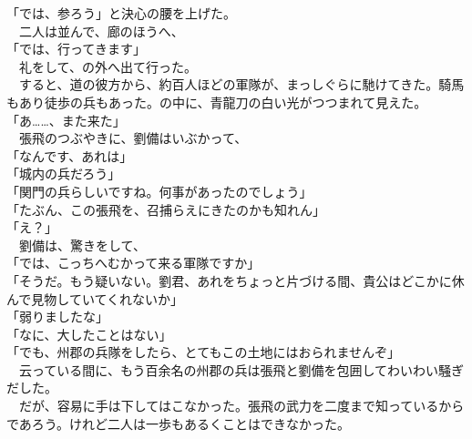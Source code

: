 \documentclass[
  paper=a5,
  fontsize=10pt,
  jafontsize=9.5pt,
  tate,                  %
  open_bracket_pos=nibu, %
]{jlreq}
\begin{document}
「では、参ろう」と決心の腰を上げた。\\


　二人は並んで、廊のほうへ、\\


「では、行ってきます」\\


　礼をして、の外へ出て行った。\\


　すると、道の彼方から、約百人ほどの軍隊が、まっしぐらに馳けてきた。騎馬もあり徒歩の兵もあった。の中に、青龍刀の白い光がつつまれて見えた。\\


「あ……、また来た」\\


　張飛のつぶやきに、劉備はいぶかって、\\


「なんです、あれは」\\


「城内の兵だろう」\\


「関門の兵らしいですね。何事があったのでしょう」\\


「たぶん、この張飛を、召捕らえにきたのかも知れん」\\


「え？」\\


　劉備は、驚きをして、\\


「では、こっちへむかって来る軍隊ですか」\\


「そうだ。もう疑いない。劉君、あれをちょっと片づける間、貴公はどこかに休んで見物していてくれないか」\\


「弱りましたな」\\


「なに、大したことはない」\\


「でも、州郡の兵隊をしたら、とてもこの土地にはおられませんぞ」\\


　云っている間に、もう百余名の州郡の兵は張飛と劉備を包囲してわいわい騒ぎだした。\\


　だが、容易に手は下してはこなかった。張飛の武力を二度まで知っているからであろう。けれど二人は一歩もあるくことはできなかった。\\
\end{document}

